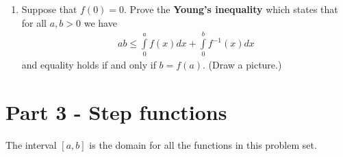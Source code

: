 \documentclass[9pt, a4paper, oneside]{amsart}
\begin{document}
\begin{questions}[resume]
\begin{enumerate}
		\item Suppose that $ f(0) = 0$. Prove the \textbf{Young's inequality} which states that for all $ a,b > 0$ we have
		      \begin{align*}
		      	ab \le \int \limits_0 ^ a f(x) dx + \int \limits_0 ^ b f^{-1}(x) dx
		      \end{align*}
		      and equality holds if and only if $ b =f(a)$. (Draw a picture.)
	\end{enumerate}
\end{questions}









\newpage
\section*{Part 3 - Step functions}
The interval $ [a,b]$ is the domain for all the functions in this problem set.
\end{document}
